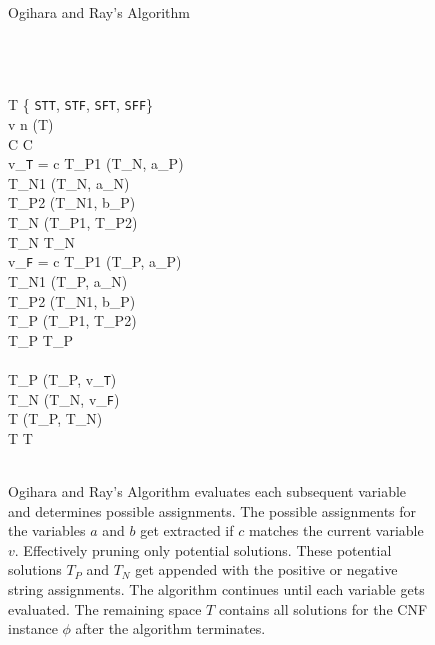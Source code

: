 
\begin{figure}[htbp]
\begin{center}

	\begin{pseudocode}{Ogihara and Ray's Algorithm}{\phi}
	
	\\
	\\
	\\
	T \GETS \{ \texttt{STT}, \texttt{STF}, \texttt{SFT},  \texttt{SFF}\} \\
	
	\FOR v   n \DO
		\BEGIN
		[T_P, T_N] \GETS {}(T)\\
	
		\FOREACH {} C  \phi \DO
			\BEGIN
				[a, b, c] \GETS C\\
				\IF v_{\texttt{T}} = c  \THEN
					\BEGIN
						T_{P1} \GETS {}(T_N, a_P)\\
						T_{N1} \GETS {}(T_N, a_N)\\				
						T_{P2} \GETS {}(T_{N1}, b_P)\\
						T_{N} \GETS {}(T_{P1}, T_{P2})\\
						T_{N} \GETS {}T_{N}\text{)}					
					\END \\  
				\IF v_{\texttt{F}} = c \THEN
					\BEGIN
						T_{P1} \GETS {}(T_P, a_P)\\
						T_{N1} \GETS {}(T_P, a_N)\\				
						T_{P2} \GETS {}(T_{N1}, b_P)\\
						T_{P} \GETS {}(T_{P1}, T_{P2})\\
						T_{P} \GETS {}T_{P}\text{)} 						
					\END\\
			\END\\
			T_P \GETS {}(T_P, v_{\texttt{T}})\\
			T_N \GETS {}(T_N, v_{\texttt{F}})\\
			T \GETS {}(T_P, T_N)\\
			T \GETS {}T\text{)} \\									
		\END\\
	\end{pseudocode}

\caption{{\sc Ogihara and Ray's Algorithm} evaluates each subsequent variable and determines possible assignments.  The possible assignments for the variables $a$ and $b$ get extracted if $c$ matches the current variable $v$.  Effectively pruning only potential solutions.  These potential solutions $T_P$ and $T_N$ get appended with the positive or negative string assignments.  The algorithm continues until each variable gets evaluated.  The remaining space $T$ contains all solutions for the CNF instance $\phi$ after the algorithm terminates.}
\label{ogiharaRayAlgorithm}
\end{center}
\end{figure}

